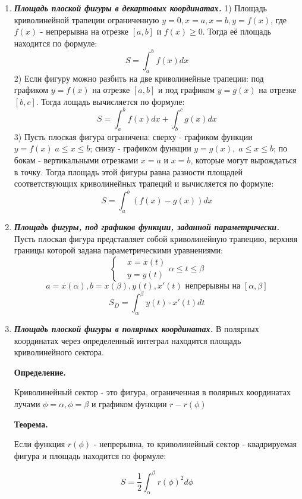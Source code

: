 \documentclass[a4paper,12pt]{article}
\theoremstyle{plain} %
\theoremstyle{definition} %
\theoremstyle{remark} %
\begin{document}
\begin{enumerate}
	\item \textit{\textbf{Площадь плоской фигуры в декартовых координатах.}}
	      1) Площадь криволинейной трапеции ограниченную $y = 0, x = a, x = b, y = f(x)$, где $f(x)$ - непрерывна на отрезке $[a, b]$ и $f(x) \geq 0$. Тогда её площадь находится по формуле:
	      \[ S = \int_a^b f(x) dx \]
	      2) Если фигуру можно разбить на две криволинейные трапеции: под графиком $y = f(x)$ на отрезке $[a, b]$ и под графиком $y = g(x)$ на отрезке $[b, c]$. Тогда лощадь вычисляется по формуле:
	      \[ S = \int_a^b f(x) dx + \int_b^c g(x) dx \]
	      3) Пусть плоская фигура ограничена: сверху - графиком функции $ y = f(x) \; a \leq x \leq b$; снизу - графиком функции $y = g(x), \; a \leq x \leq b$; по бокам - вертикальными отрезками $x = a$ и $x = b$, которые могут вырождаться в точку. Тогда площадь этой фигуры равна разности площадей соответствующих криволинейных трапеций и вычисляется по формуле:
	      \[ S = \int_a^b (f(x) - g(x)) dx \]

	\item \textit{\textbf{Площадь фигуры, под графиков функции, заданной параметрически.}}
	      Пусть плоская фигура представляет собой криволинейную трапецию, верхняя границы которой задана параметрическими уравнениями:
	      \[
		      \begin{cases}
			       & x = x(t) \\
			       & y = y(t)
		      \end{cases}
		      \alpha \leq t \leq \beta
	      \]
	      \[ a = x(\alpha), b = x(\beta), y(t), x'(t) \text{ непрерывны на } [\alpha, \beta] \]
	      \[ S_D = \int_\alpha^\beta y(t) \cdot x'(t) dt \]

	\item \textit{\textbf{Площадь плоской фигуры в полярных координатах.}}
	      В полярных координатах через определенный интеграл находится площадь криволинейного сектора.

	      \textbf{Определение.}

	      Криволинейный сектор - это фигура, ограниченная в полярных координатах лучами $\phi = \alpha, \phi = \beta$ и графиком функции $r - r (\phi)$

	      \textbf{Теорема.}

	      Если функция $r(\phi)$ - непрерывна, то криволинейный сектор - квадрируемая фигура и площадь находится по формуле:

	      \[ S = \frac{1}{2} \int_\alpha^\beta r(\phi)^2 d \phi \]

\end{enumerate}
\end{document}
